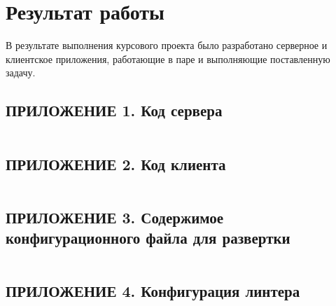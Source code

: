 \documentclass[a4paper, 12pt]{article}
\begin{document}
    \section*{Результат работы}
    В результате выполнения курсового проекта было разработано серверное и клиентское приложения,
    работающие в паре и выполняющие поставленную задачу.

    \newpage
    \subsection*{ПРИЛОЖЕНИЕ 1. Код сервера}
    \inputminted{JavaScript}{../source/server.js}

    \newpage
    \subsection*{ПРИЛОЖЕНИЕ 2. Код клиента}
    \inputminted{JavaScript}{../source/client.js}

    \newpage
    \subsection*{ПРИЛОЖЕНИЕ 3. Содержимое конфигурационного файла для развертки}
    \inputminted{JavaScript}{../ecosystem.config.js}

    \newpage
    \subsection*{ПРИЛОЖЕНИЕ 4. Конфигурация линтера}
    \inputminted{JavaScript}{../.eslintrc.js}
\end{document}
